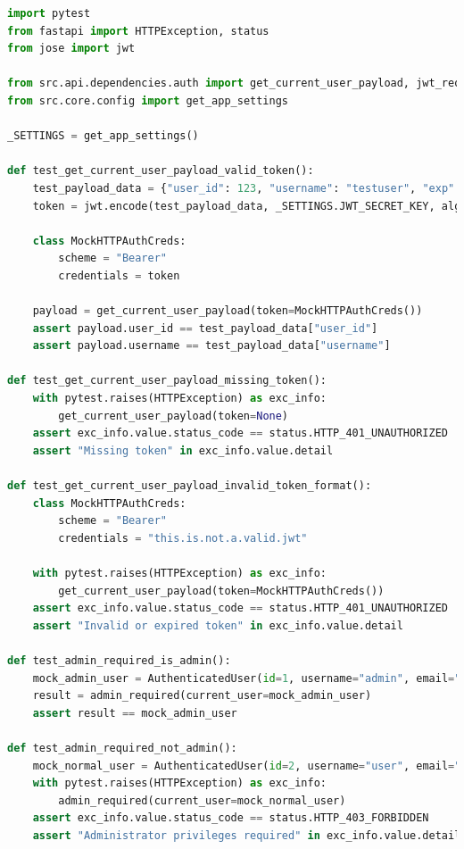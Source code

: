 \begin{lstlisting}[language=python,
                   caption={Extracto de pruebas unitarias para dependencias de autenticación (\texttt{tests/unit/api/dependencies/test\_auth\_dependency.py}).},
                   label={lst:desarrollo_auth-tests_unit}, % Label actualizada
                   basicstyle=\fontsize{8}{9.5}\ttfamily]
import pytest
from fastapi import HTTPException, status
from jose import jwt

from src.api.dependencies.auth import get_current_user_payload, jwt_required, admin_required, AuthenticatedUser, TokenPayload
from src.core.config import get_app_settings

_SETTINGS = get_app_settings()

def test_get_current_user_payload_valid_token():
    test_payload_data = {"user_id": 123, "username": "testuser", "exp": 9999999999}
    token = jwt.encode(test_payload_data, _SETTINGS.JWT_SECRET_KEY, algorithm=_SETTINGS.JWT_ALGORITHM)
    
    class MockHTTPAuthCreds:
        scheme = "Bearer"
        credentials = token
    
    payload = get_current_user_payload(token=MockHTTPAuthCreds())
    assert payload.user_id == test_payload_data["user_id"]
    assert payload.username == test_payload_data["username"]

def test_get_current_user_payload_missing_token():
    with pytest.raises(HTTPException) as exc_info:
        get_current_user_payload(token=None)
    assert exc_info.value.status_code == status.HTTP_401_UNAUTHORIZED
    assert "Missing token" in exc_info.value.detail

def test_get_current_user_payload_invalid_token_format():
    class MockHTTPAuthCreds:
        scheme = "Bearer"
        credentials = "this.is.not.a.valid.jwt"
        
    with pytest.raises(HTTPException) as exc_info:
        get_current_user_payload(token=MockHTTPAuthCreds())
    assert exc_info.value.status_code == status.HTTP_401_UNAUTHORIZED
    assert "Invalid or expired token" in exc_info.value.detail

def test_admin_required_is_admin():
    mock_admin_user = AuthenticatedUser(id=1, username="admin", email="admin@example.com", is_admin=True)
    result = admin_required(current_user=mock_admin_user)
    assert result == mock_admin_user

def test_admin_required_not_admin():
    mock_normal_user = AuthenticatedUser(id=2, username="user", email="user@example.com", is_admin=False)
    with pytest.raises(HTTPException) as exc_info:
        admin_required(current_user=mock_normal_user)
    assert exc_info.value.status_code == status.HTTP_403_FORBIDDEN
    assert "Administrator privileges required" in exc_info.value.detail
\end{lstlisting}

